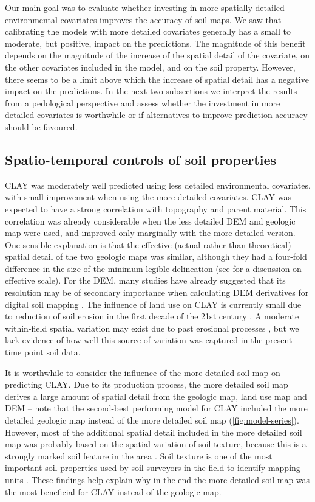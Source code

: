 Our main goal was to evaluate whether investing in more spatially detailed 
environmental covariates improves the accuracy of soil maps. We saw that 
calibrating the models with more detailed covariates generally has a small to 
moderate, but positive, impact on the predictions. The magnitude of this 
benefit depends on the magnitude of the increase of the spatial detail of the 
covariate, on the other covariates included in the model, and on the soil 
property. However, there seems to be a limit above which the increase of spatial
detail has a negative impact on the predictions. In the next two subsections we
interpret the results from a pedological perspective and assess whether the 
investment in more detailed covariates is worthwhile or if alternatives to 
improve prediction accuracy should be favoured.

\subsection{Spatio-temporal controls of soil properties}

CLAY was moderately well predicted using less detailed environmental covariates,
with small improvement when using the more detailed covariates. CLAY was 
expected to have a strong correlation with topography and parent material. 
This correlation was already considerable when the less detailed DEM and 
geologic map were used, and improved only marginally with the more detailed 
version. One sensible explanation is that the effective (actual rather than 
theoretical) spatial detail of the two geologic maps was similar, although they
had a four-fold difference in the size of the minimum legible delineation (see 
\citet{HenglEtAl2006a} for a discussion on effective scale). For the DEM, many 
studies have already suggested that its resolution may be of secondary 
importance when calculating DEM derivatives for digital soil mapping 
\citep{ZhuEtAl2008, BehrensEtAl2010a, MillerEtAl2015}. The influence of land 
use on CLAY is currently small due to reduction of soil erosion in the first 
decade of the 21st century \citep{MiguelEtAl2012, TenCatenEtAl2012b}. A 
moderate within-field spatial variation may exist due to past erosional 
processes \citep{MouraBueno2012}, but we lack evidence of how well this source 
of variation was captured in the present-time point soil data.

It is worthwhile to consider the influence of the more detailed soil map on 
predicting CLAY. Due to its production process, the more detailed soil map 
derives a large amount of spatial detail from the geologic map, land use map 
and DEM -- note that the second-best performing model for CLAY included the 
more detailed geologic map instead of the more detailed soil map 
(\autoref{fig:model-series}). However, most of the additional spatial detail 
included in the more detailed soil map was probably based on the spatial 
variation of soil texture, because this is a strongly marked soil feature in 
the area \citep{MiguelEtAl2012}. Soil texture is one of the most important soil 
properties used by soil surveyors in the field to identify mapping units 
\citep{Legros2006}. These findings help explain why in the end the more 
detailed soil map was the most beneficial for CLAY instead of the geologic map.

